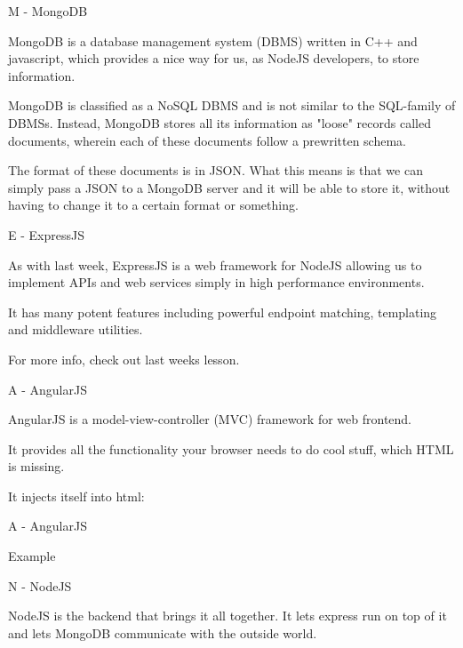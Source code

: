 \documentclass{beamer}
\begin{document}
\begin{frame}{M - MongoDB}

MongoDB is a database management system (DBMS) written in C++ and javascript, which provides a nice way for us, as NodeJS developers, to store information.\\ \pause

MongoDB is classified as a NoSQL DBMS and is not similar to the SQL-family of DBMSs. Instead, MongoDB stores all its information as "loose" records called documents, wherein each of these documents follow a prewritten schema.\\ \pause

The format of these documents is in JSON. What this means is that we can simply pass a JSON to a MongoDB server and it will be able to store it, without having to change it to a certain format or something.

\end{frame}

\begin{frame}{E - ExpressJS}

As with last week, ExpressJS is a web framework for NodeJS allowing us to implement APIs and web services simply in high performance environments.\\ \pause

It has many potent features including powerful endpoint matching, templating and middleware utilities.\\ \pause

For more info, check out last weeks lesson.

\end{frame}

\begin{frame}{A - AngularJS}

AngularJS is a model-view-controller (MVC) framework for web frontend.\\ \pause

It provides all the functionality your browser needs to do cool stuff, which HTML is missing.\\ \pause

It injects itself into html:

\end{frame}

\begin{frame}{A - AngularJS}

Example

\end{frame}

\begin{frame}{N - NodeJS}

NodeJS is the backend that brings it all together. It lets express run on top of it and lets MongoDB communicate with the outside world.

\end{frame}
\end{document}
